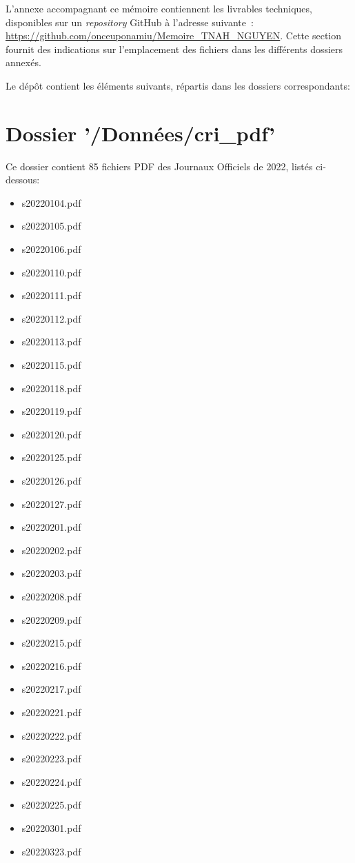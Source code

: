 \documentclass[a4paper,12pt,twoside]{book}
\begin{document}
        L'annexe accompagnant ce mémoire contiennent les livrables techniques, disponibles sur un \textit{repository} GitHub à l'adresse suivante~: \url{https://github.com/onceuponamiu/Memoire_TNAH_NGUYEN}.
Cette section fournit des indications sur l'emplacement des fichiers dans les différents dossiers annexés.

Le dépôt contient les éléments suivants, répartis dans les dossiers correspondants:

\section*{Dossier '/Données/cri\_pdf'}
Ce dossier contient 85 fichiers PDF des Journaux Officiels de 2022, listés ci-dessous:
\begin{itemize}
  \item s20220104.pdf
  \item s20220105.pdf
  \item s20220106.pdf
  \item s20220110.pdf
  \item s20220111.pdf
  \item s20220112.pdf
  \item s20220113.pdf
  \item s20220115.pdf
  \item s20220118.pdf
  \item s20220119.pdf
  \item s20220120.pdf
  \item s20220125.pdf
  \item s20220126.pdf
  \item s20220127.pdf
  \item s20220201.pdf
  \item s20220202.pdf
  \item s20220203.pdf
  \item s20220208.pdf
  \item s20220209.pdf
  \item s20220215.pdf
  \item s20220216.pdf
  \item s20220217.pdf
  \item s20220221.pdf
  \item s20220222.pdf
  \item s20220223.pdf
  \item s20220224.pdf
  \item s20220225.pdf
  \item s20220301.pdf
  \item s20220323.pdf

\end{itemize}
\end{document}
